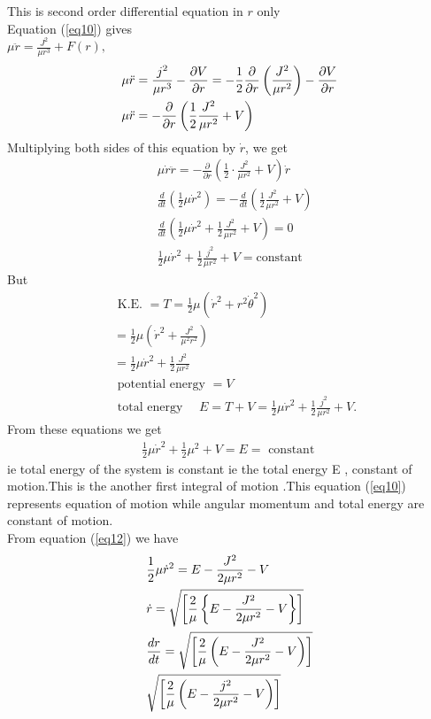 This is second order differential equation in $r$ only\\
 Equation (\ref{eq10}) gives\\
$
\mu \ddot{r}=\frac{J^{2}}{\mu r^{3}}+F(r),
$
\begin{align}
	&\mu \ddot{r}=\frac{j^{2}}{\mu r^{3}}-\frac{\partial V}{\partial r}=-\frac{1}{2} \frac{\partial}{\partial r}\left(\frac{J^{2}}{\mu r^{2}}\right)-\frac{\partial V}{\partial r} \notag \\
	&\mu \ddot{r}=-\frac{\partial}{\partial r}\left(\frac{1}{2} \frac{J^{2}}{\mu r^{2}}+V\right) \label{eq11}
\end{align}
Multiplying both sides of this equation by $\dot{r}$, we get
\begin{align*}
&\mu \dot{r} \ddot{r}=-\frac{\partial}{\partial r}\left(\frac{1}{2} \cdot \frac{J^{2}}{\mu r^{2}}+V\right) \dot{r} \\
&\frac{d}{d t}\left(\frac{1}{2} \mu \dot{r}^{2}\right)=-\frac{d}{d t}\left(\frac{1}{2} \frac{J^{2}}{\mu r^{2}}+V\right) \\
&\frac{d}{d t}\left(\frac{1}{2} \mu \dot{r}^{2}+\frac{1}{2} \frac{J^{2}}{\mu r^{2}}+V\right)=0 \\
&\frac{1}{2} \mu \dot{r}^{2}+\frac{1}{2} \frac{j^{2}}{\mu r^{2}}+V=\mathrm{constant}
\end{align*}
But
\begin{align*}
&\text { K.E. }=T=\frac{1}{2} \mu\left(\dot{r}^{2}+r^{2} \dot{\theta}^{2}\right) \\
&=\frac{1}{2} \mu\left(\dot{r}^{2}+\frac{J^{2}}{\mu^{2} r^{2}}\right) \\
&=\frac{1}{2} \mu \dot{r}^{2}+\frac{1}{2} \frac{J^{2}}{\mu r^{2}} \\
&\text { potential energy } =V\\
&\text { total energy } \quad E
=T+V=\frac{1}{2} \mu \dot{r}^{2}+\frac{1}{2} \frac{j^{2}}{\mu r^{2}}+V .
\end{align*}
From these equations we get 
\begin{align}
\frac{1}{2} \mu \dot{r}^{2}+\frac{1}{2} \mu^{2}+V=E=\text { constant } \label{eq12}
\end{align}
ie total energy of the system is constant ie the total energy E , constant of motion.This is the another first integral of motion .This equation (\ref{eq10}) represents equation of motion while angular momentum and total energy are constant of motion.\\
From equation (\ref{eq12}) we have
\begin{align}
	&\frac{1}{2} \mu \dot{r}^{2}=E-\frac{J^{2}}{2 \mu r^{2}}-V \notag\\
	&\dot{r}=\sqrt{\left[\frac{2}{\mu}\left\{E-\frac{J^{2}}{2 \mu r^{2}}-V\right\}\right]} \notag\\
	&\frac{d r}{d t}=\sqrt{\left[\frac{2}{\mu}\left(E-\frac{J^{2}}{2 \mu r^{2}}-V\right)\right]} \notag\\
	&\sqrt{\left[\frac{2}{\mu}\left(E-\frac{j^{2}}{2 \mu r^{2}}-V\right)\right]} \label{eq15}
\end{align}
